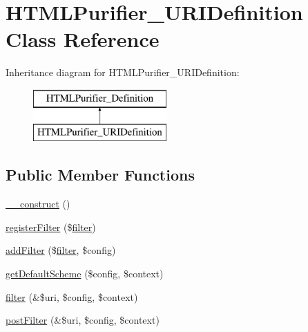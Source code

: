 \hypertarget{classHTMLPurifier__URIDefinition}{\section{H\+T\+M\+L\+Purifier\+\_\+\+U\+R\+I\+Definition Class Reference}
\label{classHTMLPurifier__URIDefinition}
}
Inheritance diagram for H\+T\+M\+L\+Purifier\+\_\+\+U\+R\+I\+Definition\+:\begin{figure}[H]
\begin{center}
\leavevmode
\includegraphics[height=2.000000cm]{classHTMLPurifier__URIDefinition}
\end{center}
\end{figure}
\subsection*{Public Member Functions}
\begin{DoxyCompactItemize}
\item 
\hyperlink{classHTMLPurifier__URIDefinition_af6cba5698d65b636d0da90c9391c8591}{\+\_\+\+\_\+construct} ()
\item 
\hyperlink{classHTMLPurifier__URIDefinition_a5f7785e149b2b31fd2831bbe163ecf25}{register\+Filter} (\$\hyperlink{classHTMLPurifier__URIDefinition_a13edb4d55d3bde01fc9c0fe5faa674e8}{filter})
\item 
\hyperlink{classHTMLPurifier__URIDefinition_a161eff8655b9b55f17e1794045c459fa}{add\+Filter} (\$\hyperlink{classHTMLPurifier__URIDefinition_a13edb4d55d3bde01fc9c0fe5faa674e8}{filter}, \$config)
\item 
\hyperlink{classHTMLPurifier__URIDefinition_a8aa459d2b4b7eea015172c17cc6cc7d9}{get\+Default\+Scheme} (\$config, \$context)
\item 
\hyperlink{classHTMLPurifier__URIDefinition_a13edb4d55d3bde01fc9c0fe5faa674e8}{filter} (\&\$uri, \$config, \$context)
\item 
\hyperlink{classHTMLPurifier__URIDefinition_ab49841ab6370120386ced8471bdc3971}{post\+Filter} (\&\$uri, \$config, \$context)
\end{DoxyCompactItemize}
